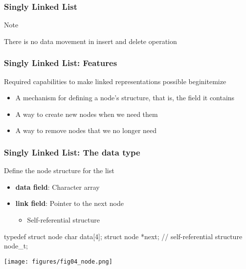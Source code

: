 \documentclass[newPxFont,sthlmFooter,nooffset]{beamer}
\begin{document}
\begin{frame}[t]
  \frametitle{Singly Linked List}
\bigskip
  \begin{block}{Note}
    \begin{center}
\bigskip

      There is no data movement in insert and delete operation


\bigskip
    \end{center}

  \end{block}
\end{frame}

\begin{frame}[t]
  \frametitle{Singly Linked List: Features}
  
Required capabilities to make linked representations possible
begin{itemize}
\begin{itemize}
\item A mechanism for defining a node’s structure, that is, the
  field it contains
\item A way to create new nodes when we need them
\item A way to remove nodes that we no longer need
\end{itemize}

\end{frame}

\begin{frame}[t, fragile]
  \frametitle{Singly Linked List: The data type}
  Define the node structure for the list
  \begin{itemize}
  \item \textbf{data field}: Character array
  \item \textbf{link field}: Pointer to the next node
    \begin{itemize}
    \item Self-referential structure
    \end{itemize}
  \end{itemize}

  \begin{ncodedef}
typedef struct node {
    char data[4];
    struct node *next; // self-referential structure
} node_t;
  \end{ncodedef}
  \begin{center}
    \texttt{[image: figures/fig04\_node.png]}
  \end{center}

\end{frame}
\end{document}

